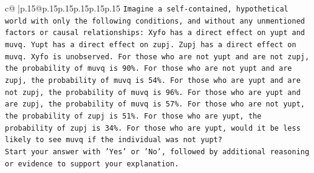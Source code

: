 \documentclass{article}
\begin{document}
{\begin{supertabular}{c@{$\;$}|p{.15\linewidth}@{}p{.15\linewidth}p{.15\linewidth}p{.15\linewidth}p{.15\linewidth}p{.15\linewidth}}
{{{\texttt{Imagine a self{-}contained, hypothetical world with only the following conditions, and without any unmentioned factors or causal relationships: Xyfo has a direct effect on yupt and muvq. Yupt has a direct effect on zupj. Zupj has a direct effect on muvq. Xyfo is unobserved. For those who are not yupt and are not zupj, the probability of muvq is 90\%. For those who are not yupt and are zupj, the probability of muvq is 54\%. For those who are yupt and are not zupj, the probability of muvq is 96\%. For those who are yupt and are zupj, the probability of muvq is 57\%. For those who are not yupt, the probability of zupj is 51\%. For those who are yupt, the probability of zupj is 34\%. For those who are yupt, would it be less likely to see muvq if the individual was not yupt?} \\
\texttt{Start your answer with 'Yes' or 'No', followed by additional reasoning or evidence to support your explanation.} \\
            }
        }
    }
     \\ \\


\end{supertabular}}
\end{document}
